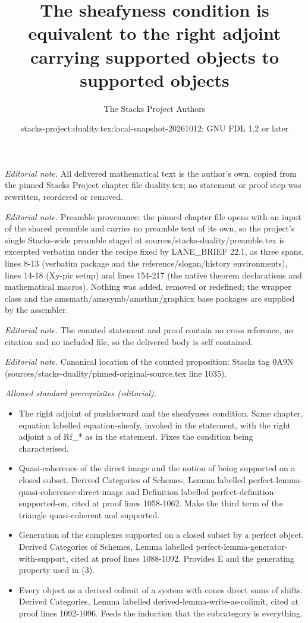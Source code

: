 \documentclass[10pt,a4paper]{amsart}
\title{The sheafyness condition is equivalent to the right adjoint carrying supported objects to supported objects}
\author{The Stacks Project Authors}
\date{stacks-project:duality.tex:local-snapshot-20261012; GNU FDL 1.2 or later}
\theoremstyle{plain}
\theoremstyle{definition}
\theoremstyle{remark}
\numberwithin{equation}{subsection}
\begin{document}
\maketitle
\noindent\textit{Editorial note.} All delivered mathematical text is the author's own, copied from the pinned Stacks Project chapter file duality.tex; no statement or proof step was rewritten, reordered or removed.\par\medskip
\noindent\textit{Editorial note.} Preamble provenance: the pinned chapter file opens with an input of the shared preamble and carries no preamble text of its own, so the project's single Stacks-wide preamble staged at sources/stacks-duality/preamble.tex is excerpted verbatim under the recipe fixed by LANE\_BRIEF 22.1, as three spans, lines 8-13 (verbatim package and the reference/slogan/history environments), lines 14-18 (Xy-pic setup) and lines 154-217 (the native theorem declarations and mathematical macros). Nothing was added, removed or redefined; the wrapper class and the amsmath/amssymb/amsthm/graphicx base packages are supplied by the assembler.\par\medskip
\noindent\textit{Editorial note.} The counted statement and proof contain no cross reference, no citation and no included file, so the delivered body is self contained.\par\medskip
\noindent\textit{Editorial note.} Canonical location of the counted proposition: Stacks tag 0A9N (sources/stacks-duality/pinned-original-source.tex line 1035).\par\medskip
\noindent\textit{Allowed standard prerequisites (editorial).}\begin{itemize}
\item The right adjoint of pushforward and the sheafyness condition. Same chapter, equation labelled equation-sheafy, invoked in the statement, with the right adjoint a of Rf\_* as in the statement. Fixes the condition being characterised.
\item Quasi-coherence of the direct image and the notion of being supported on a closed subset. Derived Categories of Schemes, Lemma labelled perfect-lemma-quasi-coherence-direct-image and Definition labelled perfect-definition-supported-on, cited at proof lines 1058-1062. Make the third term of the triangle quasi-coherent and supported.
\item Generation of the complexes supported on a closed subset by a perfect object. Derived Categories of Schemes, Lemma labelled perfect-lemma-generator-with-support, cited at proof lines 1088-1092. Provides E and the generating property used in (3).
\item Every object as a derived colimit of a system with cones direct sums of shifts. Derived Categories, Lemma labelled derived-lemma-write-as-colimit, cited at proof lines 1092-1096. Feeds the induction that the subcategory is everything.
\end{itemize}\medskip
\end{document}
